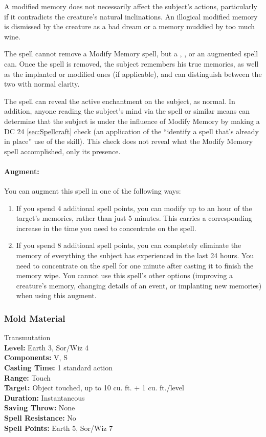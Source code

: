 A modified memory does not necessarily affect the subject's actions, particularly if it contradicts the creature's natural inclinations. An illogical modified memory is dismissed by the creature as a bad dream or a memory muddied by too much wine.

The  spell cannot remove a Modify Memory spell, but a , ,  or an augmented  spell can. Once the spell is removed, the subject remembers his true memories, as well as the implanted or modified ones (if applicable), and can distinguish between the two with normal clarity.

The  spell can reveal the active enchantment on the subject, as normal.
In addition, anyone reading the subject's mind via the  spell or similar means can determine that the subject is under the influence of Modify Memory by making a DC 24 \ref{sec:Spellcraft} check (an application of the ``identify a spell that's already in place'' use of the skill). This check does not reveal what the Modify Memory spell accomplished, only its presence.

\paragraph{Augment:} You can augment this spell in one of the following ways:
\begin{enumerate}
 \item If you spend 4 additional spell points, you can modify up to an hour of the target's memories, rather than just 5 minutes.
 This carries a corresponding increase in the time you need to concentrate on the spell.
 \item If you spend 8 additional spell points, you can completely eliminate the memory of everything the subject has experienced in the last 24 hours. You need to concentrate on the spell for one minute after casting it to finish the memory wipe. You cannot use this spell's other options (improving a creature's memory, changing details of an event, or implanting new memories) when using this augment.
\end{enumerate}

\subsubsection{Mold Material}
\label{Spell:MoldMaterial}
Transmutation
\\ \textbf{Level:} Earth 3, Sor/Wiz 4
\\ \textbf{Components:} V, S
\\ \textbf{Casting Time:} 1 standard action
\\ \textbf{Range:} Touch
\\ \textbf{Target:} Object touched, up to 10 cu. ft. + 1 cu. ft./level
\\ \textbf{Duration:} Instantaneous
\\ \textbf{Saving Throw:} None
\\ \textbf{Spell Resistance:} No
\\ \textbf{Spell Points:} Earth 5, Sor/Wiz 7

